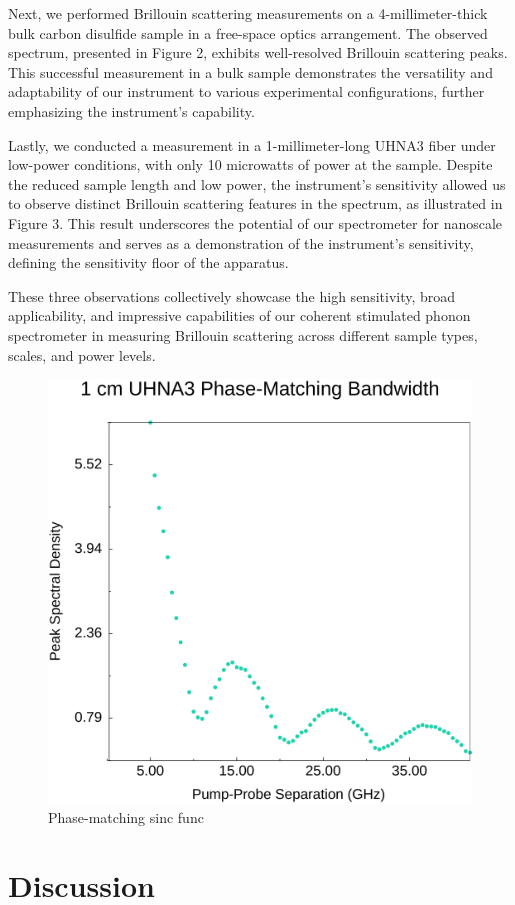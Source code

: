 \documentclass[
sn-nature,
twocolumn
]{sn-jnl}%
\begin{document}
Next, we performed Brillouin scattering measurements on a 4-millimeter-thick bulk carbon disulfide sample in a free-space optics arrangement. The observed spectrum, presented in Figure 2, exhibits well-resolved Brillouin scattering peaks. This successful measurement in a bulk sample demonstrates the versatility and adaptability of our instrument to various experimental configurations, further emphasizing the instrument's capability.

Lastly, we conducted a measurement in a 1-millimeter-long UHNA3 fiber under low-power conditions, with only 10 microwatts of power at the sample. Despite the reduced sample length and low power, the instrument's sensitivity allowed us to observe distinct Brillouin scattering features in the spectrum, as illustrated in Figure 3. This result underscores the potential of our spectrometer for nanoscale measurements and serves as a demonstration of the instrument's sensitivity, defining the sensitivity floor of the apparatus.

These three observations collectively showcase the high sensitivity, broad applicability, and impressive capabilities of our coherent stimulated phonon spectrometer in measuring Brillouin scattering across different sample types, scales, and power levels.

\begin{figure}[t]
\centering
\includegraphics[width=.45\textwidth]{Phase-Match.pdf}
\caption{Phase-matching sinc func}\label{fig:Phase-Match}
\end{figure}


\section{Discussion}\label{Discussion}

\lipsum[1-2]



%
\end{document}
